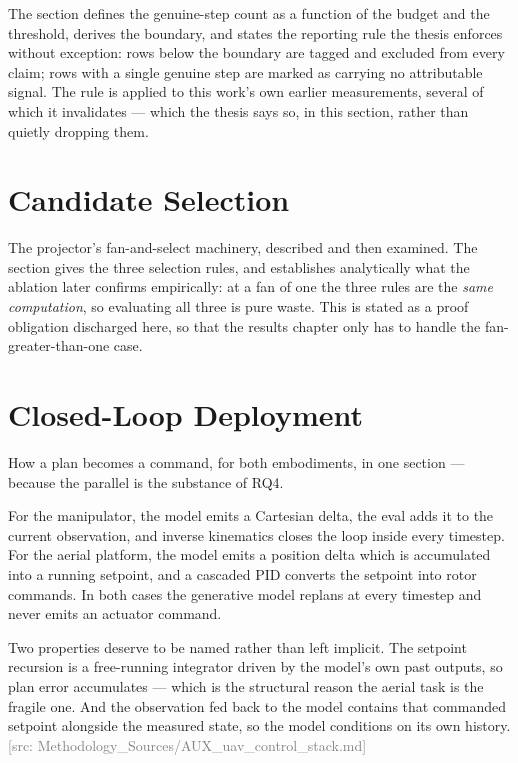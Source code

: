 \documentclass[headsepline,footsepline,footinclude=false,oneside,fontsize=11pt,paper=a4,listof=totoc,bibliography=totoc]{scrbook}
\newcommand{\srcnote}[1]{\textcolor{gray}{\footnotesize\textsf{[src: #1]}}}
\begin{document}
The section defines the genuine-step count as a function of the budget and the threshold,
derives the boundary, and states the reporting rule the thesis enforces without exception:
rows below the boundary are tagged and excluded from every claim; rows with a single genuine
step are marked as carrying no attributable signal. The rule is applied to this work's own
earlier measurements, several of which it invalidates --- which the thesis says so, in this
section, rather than quietly dropping them.

\section{Candidate Selection}\label{sec:method:selection}

The projector's fan-and-select machinery, described and then examined. The section gives the
three selection rules, and establishes analytically what the ablation later confirms
empirically: at a fan of one the three rules are the \emph{same computation}, so evaluating
all three is pure waste. This is stated as a proof obligation discharged here, so that the
results chapter only has to handle the fan-greater-than-one case.

\section{Closed-Loop Deployment}\label{sec:method:deployment}

How a plan becomes a command, for both embodiments, in one section --- because the parallel
is the substance of RQ4.

For the manipulator, the model emits a Cartesian delta, the eval adds it to the current
observation, and inverse kinematics closes the loop inside every timestep. For the aerial
platform, the model emits a position delta which is accumulated into a running setpoint, and
a cascaded PID converts the setpoint into rotor commands. In both cases the generative model
replans at every timestep and never emits an actuator command.

Two properties deserve to be named rather than left implicit. The setpoint recursion is a
free-running integrator driven by the model's own past outputs, so plan error accumulates ---
which is the structural reason the aerial task is the fragile one. And the observation fed
back to the model contains that commanded setpoint alongside the measured state, so the
model conditions on its own history.
\srcnote{Methodology\_Sources/AUX\_uav\_control\_stack.md}
\end{document}
